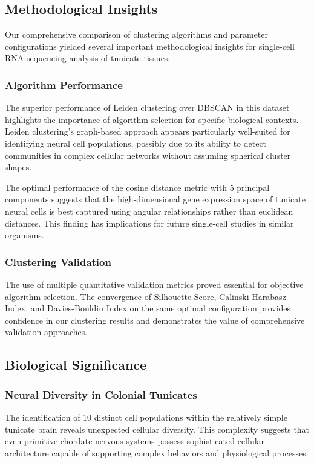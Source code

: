 \documentclass[12pt,a4paper]{article}
\begin{document}
\subsection{Methodological Insights}

Our comprehensive comparison of clustering algorithms and parameter configurations yielded several important methodological insights for single-cell RNA sequencing analysis of tunicate tissues:

\subsubsection{Algorithm Performance}
The superior performance of Leiden clustering over DBSCAN in this dataset highlights the importance of algorithm selection for specific biological contexts. Leiden clustering's graph-based approach appears particularly well-suited for identifying neural cell populations, possibly due to its ability to detect communities in complex cellular networks without assuming spherical cluster shapes.

The optimal performance of the cosine distance metric with 5 principal components suggests that the high-dimensional gene expression space of tunicate neural cells is best captured using angular relationships rather than euclidean distances. This finding has implications for future single-cell studies in similar organisms.

\subsubsection{Clustering Validation}
The use of multiple quantitative validation metrics proved essential for objective algorithm selection. The convergence of Silhouette Score, Calinski-Harabasz Index, and Davies-Bouldin Index on the same optimal configuration provides confidence in our clustering results and demonstrates the value of comprehensive validation approaches.

\subsection{Biological Significance}

\subsubsection{Neural Diversity in Colonial Tunicates}
The identification of 10 distinct cell populations within the relatively simple tunicate brain reveals unexpected cellular diversity. This complexity suggests that even primitive chordate nervous systems possess sophisticated cellular architecture capable of supporting complex behaviors and physiological processes.
\end{document}
